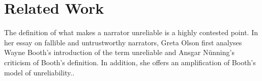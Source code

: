 \section{Related Work}
The definition of what makes a narrator unreliable is a highly contested point. In her essay on fallible and untrustworthy narrators, Greta Olson first analyses Wayne Booth's introduction of the term unreliable and Ansgar N\"unning's criticism of Booth's definition. In addition, she offers an amplification of Booth's model of unreliability.\cite{Olson}.